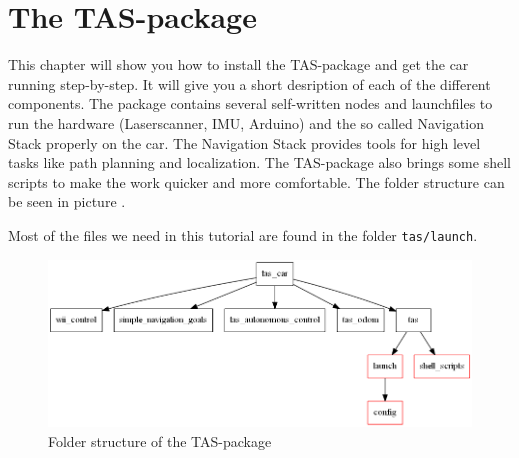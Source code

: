 \newcommand{\makro}[1]{\texttt{\textbackslash{}#1\{\}}}

\chapter{The TAS-package}
\label{sec:tas_package}

This chapter will show you how to install the TAS-package and get the car running step-by-step. It will give you a short desription of each of the different components. The package contains several self-written nodes and launchfiles to run the hardware (Laserscanner, IMU, Arduino) and the so called Navigation Stack properly on the car. The Navigation Stack provides tools for high level tasks like path planning and localization. The TAS-package also brings some shell scripts to make the work quicker and more comfortable. The folder structure can be seen in picture .

Most of the files we need in this tutorial are found in the folder \texttt{tas/launch}.

\begin{figure}[htbp]
	\centering
		\includegraphics[width=\textwidth]{diagrams/tas_folder_struct}
	\caption{Folder structure of the TAS-package}
	\label{fig:tas_folder_struct}
\end{figure}

\newpage
